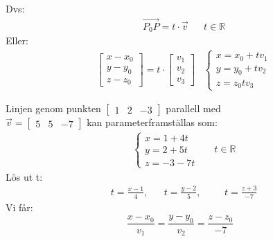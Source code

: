 \noindent
Dvs:
\begin{align*}
&\overrightarrow{P_0P} = t \cdot \vec{v} &&t\in \mathbb{R}
\end{align*}
Eller:
\begin{align*}
&\begin{bmatrix} x-x_0\\y-y_0\\z-z_0 \end{bmatrix} = t \cdot \begin{bmatrix} v_1\\v_2\\v_3 \end{bmatrix} &\begin{cases} x = x_0 + tv_1\\y=y_0+tv_2\\z=z_0tv_3 \end{cases}
\end{align*}
\newpage
\begin{Ex}
    Linjen genom punkten $\begin{bmatrix} 1&2&-3 \end{bmatrix}$ parallell med \\ $\vec{v} = \begin{bmatrix} 5&5&-7 \end{bmatrix}$ kan parameterframställas som:
    \begin{align*}
    &\begin{cases}
        x=1+4t\\y=2+5t\\z=-3-7t
    \end{cases}
    &&t\in \mathbb{R}
    \end{align*}
    Lös ut t:
    \begin{align*}
    &t=\frac{x-1}{4}, &&t=\frac{y-2}{5}, &&&t=\frac{z+3}{-7}
    \end{align*}
    Vi får:
    \[
        \frac{x-x_0}{v_1} = \frac{y-y_0}{v_2} = \frac{z-z_0}{-7}
    \]
\end{Ex}
